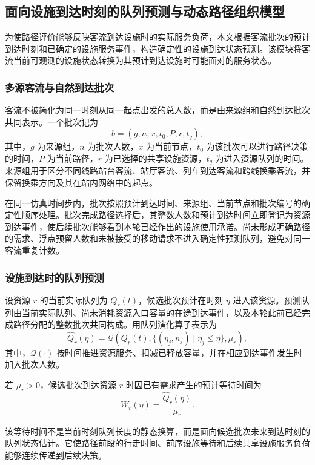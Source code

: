 \documentclass[UTF8,a4paper,12pt]{ctexart}
\begin{document}
\subsection{面向设施到达时刻的队列预测与动态路径组织模型}

为使路径评价能够反映客流到达设施时的实际服务负荷，本文根据客流批次的预计到达时刻和已确定的设施服务事件，构造确定性的设施到达状态预测。该模块将客流当前可观测的设施状态转换为其预计到达设施时可能面对的服务状态。

\subsubsection{多源客流与自然到达批次}

客流不被简化为同一时刻从同一起点出发的总人数，而是由来源组和自然到达批次共同表示。一个批次记为
\[
b=(g,n,x,t_0,P,r,t_q),
\]
其中，\(g\) 为来源组，\(n\) 为批次人数，\(x\) 为当前节点，\(t_0\) 为该批次可以进行路径决策的时间，\(P\) 为当前路径，\(r\) 为已选择的共享设施资源，\(t_q\) 为进入资源队列的时间。来源组用于区分不同线路站台客流、站厅客流、列车到达客流和跨线换乘客流，并保留换乘方向及其在站内网络中的起点。

在同一仿真时间步内，批次按照预计到达时间、来源组、当前节点和批次编号的确定性顺序处理。批次完成路径选择后，其整数人数和预计到达时间立即登记为资源到达事件，使后续批次能够看到本轮已经作出的设施使用承诺。尚未形成明确路径的需求、浮点预留人数和未被接受的移动请求不进入确定性预测队列，避免对同一客流重复计数。

\subsubsection{设施到达时的队列预测}

设资源 \(r\) 的当前实际队列为 \(Q_r(t)\)，候选批次预计在时刻 \(\eta\) 进入该资源。预测队列由当前实际队列、尚未消耗资源入口容量的在途到达事件，以及本轮此前已经完成路径分配的整数批次共同构成。用队列演化算子表示为
\[
\widehat Q_r(\eta)=\mathcal{Q}\left(Q_r(t),\{(\eta_j,n_j)\mid \eta_j\leq\eta\},\mu_r\right),
\]
其中，\(\mathcal{Q}(\cdot)\) 按时间推进资源服务、扣减已释放容量，并在相应到达事件发生时加入批次人数。

若 \(\mu_r>0\)，候选批次到达资源 \(r\) 时因已有需求产生的预计等待时间为
\[
W_r(\eta)=\frac{\widehat Q_r(\eta)}{\mu_r}.
\]

该等待时间不是当前时刻队列长度的静态换算，而是面向候选批次未来到达时刻的队列状态估计。它使路径前段的行走时间、前序设施等待和后续共享设施服务负荷能够连续传递到后续决策。
\end{document}
